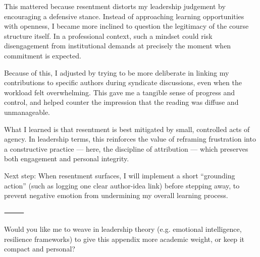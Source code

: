 This mattered because resentment distorts my leadership judgement by encouraging a defensive stance. Instead of approaching learning opportunities with openness, I became more inclined to question the legitimacy of the course structure itself. In a professional context, such a mindset could risk disengagement from institutional demands at precisely the moment when commitment is expected.

Because of this, I adjusted by trying to be more deliberate in linking my contributions to specific authors during syndicate discussions, even when the workload felt overwhelming. This gave me a tangible sense of progress and control, and helped counter the impression that the reading was diffuse and unmanageable.

What I learned is that resentment is best mitigated by small, controlled acts of agency. In leadership terms, this reinforces the value of reframing frustration into a constructive practice — here, the discipline of attribution — which preserves both engagement and personal integrity.

Next step: When resentment surfaces, I will implement a short “grounding action” (such as logging one clear author-idea link) before stepping away, to prevent negative emotion from undermining my overall learning process.

⸻

Would you like me to weave in leadership theory (e.g. emotional intelligence, resilience frameworks) to give this appendix more academic weight, or keep it compact and personal?